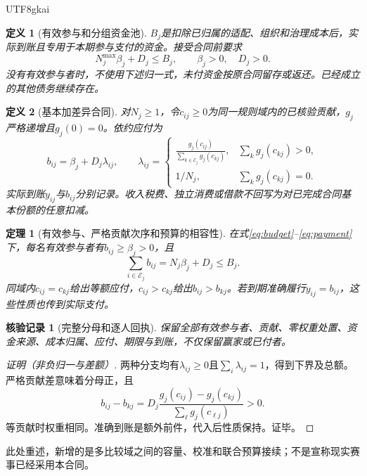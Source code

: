 \documentclass[12pt,a4paper,openany]{report}
\newtheorem{definition}{定义}[chapter]
\newtheorem{theorem}{定理}[chapter]
\newtheorem{Certificate}{核验记录}[chapter]
\newcommand{\EEset}{\mathcal E}
\begin{document}
\begin{CJK*}{UTF8}{gkai}
\begin{definition}[有效参与和分组资金池]
$B_j$是扣除已归属的适配、组织和治理成本后，实际到账且专用于本期参与支付的资金。接受合同前要求
\begin{equation}\label{eq:budget}
 N_j^{\max}\beta_j+D_j\le B_j,
 \qquad\beta_j>0,\quad D_j>0.
\end{equation}
没有有效参与者时，不使用下述归一式，未付资金按原合同留存或返还。已经成立的其他债务继续存在。
\end{definition}
\begin{definition}[基本加差异合同]
\label{def:payment}
对$N_j\ge1$，令$c_{ij}\ge0$为同一规则域内的已核验贡献，$g_j$严格递增且$g_j(0)=0$。依约应付为
\begin{equation}\label{eq:payment}
 b_{ij}=\beta_j+D_j\lambda_{ij},\qquad
 \lambda_{ij}=\begin{cases}
 \displaystyle\frac{g_j(c_{ij})}{\sum_{k\in\EEset_j}g_j(c_{kj})},&\sum_k g_j(c_{kj})>0,\\[1.2ex]
 1/N_j,&\sum_k g_j(c_{kj})=0.
 \end{cases}
\end{equation}
实际到账$y_{ij}$与$b_{ij}$分别记录。收入税费、独立消费或借款不回写为对已完成合同基本份额的任意扣减。
\end{definition}
\begin{theorem}[有效参与、严格贡献次序和预算的相容性]
\label{thm:distribution}
在式\eqref{eq:budget}--\eqref{eq:payment}下，每名有效参与者有$b_{ij}\ge\beta_j>0$，且
\[
 \sum_{i\in\EEset_j}b_{ij}=N_j\beta_j+D_j\le B_j.
\]
同域内$c_{ij}=c_{kj}$给出等额应付，$c_{ij}>c_{kj}$给出$b_{ij}>b_{kj}$。若到期准确履行$y_{ij}=b_{ij}$，这些性质也传到实际支付。
\end{theorem}
\begin{Certificate}[完整分母和逐人回执]
保留全部有效参与者、贡献、零权重处置、资金来源、成本归属、应付、期限与到账，不仅保留赢家或已付者。
\end{Certificate}
\begin{proof}[证明（非负归一与差额）]
两种分支均有$\lambda_{ij}\ge0$且$\sum_i\lambda_{ij}=1$，得到下界及总额。严格贡献差意味着分母正，且
\[
 b_{ij}-b_{kj}
 =D_j\frac{g_j(c_{ij})-g_j(c_{kj})}{\sum_\ell g_j(c_{\ell j})}>0.
\]
等贡献时权重相同。准确到账是额外前件，代入后性质保持。证毕。
\end{proof}
此处重述\cite[“参与即分配与能者多得的资金覆盖定理”]{SourceMarket}，新增的是多比较域之间的容量、校准和联合预算接续；不是宣称现实赛事已经采用本合同。


\end{CJK*}
\end{document}
